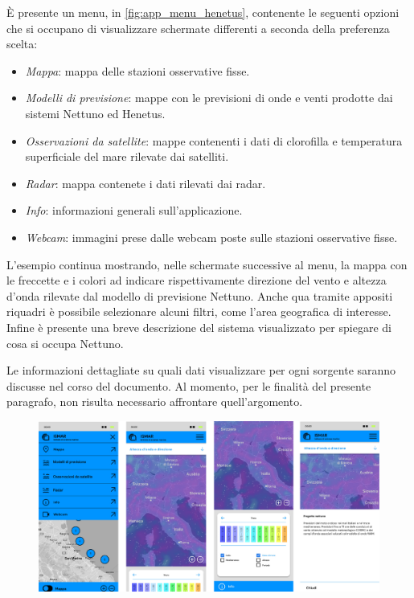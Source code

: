 \documentclass[./main.tex]{subfiles}
\begin{document}
È presente un menu, in \autoref{fig:app_menu_henetus}, contenente le seguenti opzioni che si occupano di visualizzare schermate differenti a seconda della preferenza scelta:
\begin{itemize}
    \item \textit{Mappa}: mappa delle stazioni osservative fisse.
    \item \textit{Modelli di previsione}: mappe con le previsioni di onde e venti prodotte dai sistemi Nettuno ed Henetus.
    \item \textit{Osservazioni da satellite}: mappe contenenti i dati di clorofilla e temperatura superficiale del mare rilevate dai satelliti.
    \item \textit{Radar}: mappa contenete i dati rilevati dai radar.
    \item \textit{Info}: informazioni generali sull'applicazione.
    \item \textit{Webcam}: immagini prese dalle webcam poste sulle stazioni osservative fisse.
\end{itemize}

L'esempio continua mostrando, nelle schermate successive al menu, la mappa con le freccette e i colori ad indicare rispettivamente direzione del vento e altezza d'onda rilevate dal modello di previsione Nettuno. Anche qua tramite appositi riquadri è possibile selezionare alcuni filtri, come l'area geografica di interesse. Infine è presente una breve descrizione del sistema visualizzato per spiegare di cosa si occupa Nettuno.

Le informazioni dettagliate su quali dati visualizzare per ogni sorgente saranno discusse nel corso del documento. Al momento, per le finalità del presente paragrafo, non risulta necessario affrontare quell'argomento.

\begin{figure}[!ht]
\noindent\begin{minipage}{\textwidth}
\vspace{1cm}
\includegraphics[width=\textwidth]{images/app_ismar_data_menu_nettuno.pdf}
\captionsetup{font=small, hypcap=false}
\label{fig:app_menu_henetus}
\end{minipage}
\vspace{0.25cm}
\end{figure}
\end{document}

